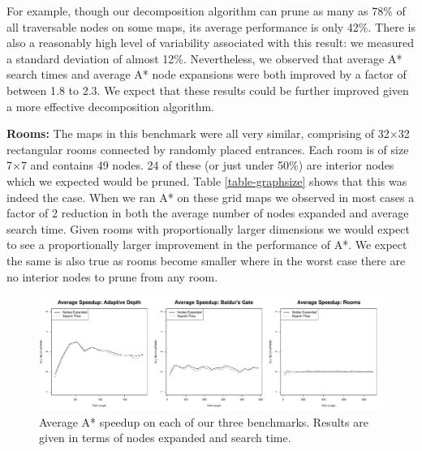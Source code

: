 For example, though our decomposition algorithm can prune as many as 78\% of all
traversable nodes on some maps, its average performance is only
42\%.  There is also a reasonably high level of variability associated with this result:
we measured a standard deviation of almost 12\%. 
Nevertheless, we observed that average A* search times and average A* node expansions
were both improved by a factor of between 1.8 to 2.3. 
We expect that these results could be
further improved given a more effective decomposition algorithm.
\par 
\textbf{Rooms:} 
The maps in this benchmark were all very similar, comprising of
32$\times$32 rectangular rooms connected by randomly placed entrances.
Each room is of size 7$\times$7 and contains 49 nodes.  
24 of these
(or just under 50\%) are interior nodes which we expected would be
pruned.  
Table \ref{table-graphsize} shows that this was indeed the case.
When we ran A* on these grid maps we observed in most cases a factor of 2 
reduction in both the average number of nodes expanded and average search time.
Given rooms with proportionally larger dimensions
we would expect to see a proportionally larger improvement in the
performance of A*.  We expect the same is also true as rooms become
smaller where in the worst case there are no interior nodes to prune
from any room.

\begin{figure}[t]
       \begin{center}
                       \includegraphics[width=1.95\columnwidth, trim = 10mm 10mm 10mm 0mm]{diagrams/speedup.pdf}
       \end{center}
       \caption{Average A* speedup on each of our three benchmarks. 
		Results are given in terms of nodes expanded and search time.}
\label{fig-speedup}
\end{figure}
